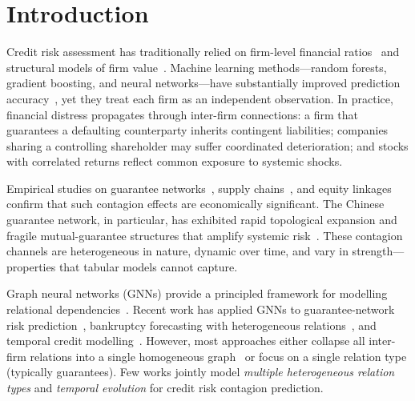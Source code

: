 \documentclass[3p,times,procedia]{elsarticle}
\begin{document}
\section{Introduction}
\label{sec:intro}

Credit risk assessment has traditionally relied on firm-level financial ratios~\cite{altman1968financial, ohlson1980financial} and structural models of firm value~\cite{merton1974pricing}.
Machine learning methods---random forests, gradient boosting, and neural networks---have substantially improved prediction accuracy~\cite{barboza2017machine, moscatelli2020corporate}, yet they treat each firm as an independent observation.
In practice, financial distress propagates through inter-firm connections: a firm that guarantees a defaulting counterparty inherits contingent liabilities; companies sharing a controlling shareholder may suffer coordinated deterioration; and stocks with correlated returns reflect common exposure to systemic shocks.

Empirical studies on guarantee networks~\cite{lv2023guarantee, niu2020guarantee, ma2022credit}, supply chains~\cite{li2024credit, chen2024supply}, and equity linkages~\cite{wang2019risk} confirm that such contagion effects are economically significant.
The Chinese guarantee network, in particular, has exhibited rapid topological expansion and fragile mutual-guarantee structures that amplify systemic risk~\cite{niu2020guarantee}.
These contagion channels are heterogeneous in nature, dynamic over time, and vary in strength---properties that tabular models cannot capture.

Graph neural networks (GNNs) provide a principled framework for modelling relational dependencies~\cite{kipf2017semi, velickovic2018graph}.
Recent work has applied GNNs to guarantee-network risk prediction~\cite{cheng2020contagion, cheng2022contagion}, bankruptcy forecasting with heterogeneous relations~\cite{zhao2024combining, zheng2023qtiah, cheng2022financial}, and temporal credit modelling~\cite{wang2021temporal, chen2024temporal}.
However, most approaches either collapse all inter-firm relations into a single homogeneous graph~\cite{cheng2020contagion} or focus on a single relation type (typically guarantees).
Few works jointly model \emph{multiple heterogeneous relation types} and \emph{temporal evolution} for credit risk contagion prediction.
\end{document}
